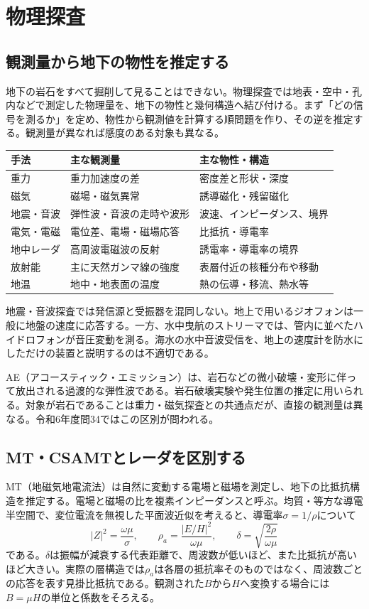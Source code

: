 \chapter{物理探査}
\section{観測量から地下の物性を推定する}
\label{theory:exploration:observables}
地下の岩石をすべて掘削して見ることはできない。物理探査では地表・空中・孔内などで測定した物理量を、地下の物性と幾何構造へ結び付ける。まず「どの信号を測るか」を定め、物性から観測値を計算する順問題を作り、その逆を推定する。観測量が異なれば感度のある対象も異なる。

\begin{longtable}{p{}p{}p{}}
\hline
手法 & 主な観測量 & 主な物性・構造\\\hline
重力 & 重力加速度の差 & 密度差と形状・深度\\
磁気 & 磁場・磁気異常 & 誘導磁化・残留磁化\\
地震・音波 & 弾性波・音波の走時や波形 & 波速、インピーダンス、境界\\
電気・電磁 & 電位差、電場・磁場応答 & 比抵抗・導電率\\
地中レーダ & 高周波電磁波の反射 & 誘電率・導電率の境界\\
放射能 & 主に天然ガンマ線の強度 & 表層付近の核種分布や移動\\
地温 & 地中・地表面の温度 & 熱の伝導・移流、熱水等\\
\hline
\end{longtable}

地震・音波探査では発信源と受振器を混同しない。地上で用いるジオフォンは一般に地盤の速度に応答する。一方、水中曳航のストリーマでは、管内に並べたハイドロフォンが音圧変動を測る。海水の水中音波受信を、地上の速度計を防水にしただけの装置と説明するのは不適切である\cite{usgs_marine_seismic}。

AE（アコースティック・エミッション）は、岩石などの微小破壊・変形に伴って放出される過渡的な弾性波である。岩石破壊実験や発生位置の推定に用いられる\cite{sato_lei2009_ae}。対象が岩石であることは重力・磁気探査との共通点だが、直接の観測量は異なる。令和6年度問34ではこの区別が問われる。

\section{MT・CSAMTとレーダを区別する}
\label{theory:exploration:electromagnetic}
MT（地磁気地電流法）は自然に変動する電場と磁場を測定し、地下の比抵抗構造を推定する\cite{usgs_mt_metadata}。電場と磁場の比を複素インピーダンスと呼ぶ。均質・等方な導電半空間で、変位電流を無視した平面波近似を考えると、導電率\(\sigma=1/\rho\)について
\[
 |Z|^2=\frac{\omega\mu}{\sigma},\qquad
 \rho_a=\frac{|E/H|^2}{\omega\mu},\qquad
 \delta=\sqrt{\frac{2\rho}{\omega\mu}}
\]
である。\(\delta\)は振幅が減衰する代表距離で、周波数が低いほど、また比抵抗が高いほど大きい。実際の層構造では\(\rho_a\)は各層の抵抗率そのものではなく、周波数ごとの応答を表す見掛比抵抗である。観測された\(B\)から\(H\)へ変換する場合には\(B=\mu H\)の単位と係数をそろえる。

